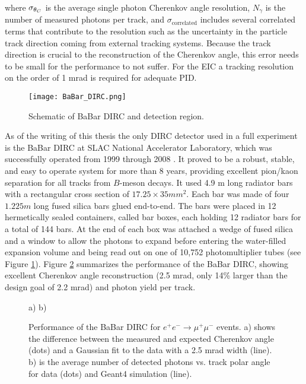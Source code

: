 where $\sigma_{\theta_{C}}$ is the average single photon Cherenkov angle resolution, $N_{\gamma}$ is the number of measured photons per track, and $\sigma_{\text{correlated}}$ includes several correlated terms that contribute to the resolution such as the uncertainty in the particle track direction coming from external tracking systems. Because the track direction is crucial to the reconstruction of the Cherenkov angle, this error needs to be small for the performance to not suffer. For the EIC a tracking resolution on the order of 1 mrad is required for adequate PID.

\begin{figure}[ht]
	\centering
	\texttt{[image: BaBar\_DIRC.png]}
	\caption{Schematic of BaBar DIRC and detection region.}
	\label{fig:babardirc}
\end{figure}

As of the writing of this thesis the only DIRC detector used in a full experiment is the BaBar DIRC at SLAC National Accelerator Laboratory, which was successfully operated from 1999 through 2008 \cite{BaBarDIRC}. It proved to be a robust, stable, and easy to operate system for more than 8 years, providing excellent pion/kaon separation for all tracks from $B$-meson decays. It used 4.9 m long radiator bars with a rectangular cross section of $17.25 \times 35 \unit{mm}^2$. Each bar was made of four $1.225\unit{m}$ long fused silica bars glued end-to-end. The bars were placed in 12 hermetically sealed containers, called bar boxes, each holding 12 radiator bars for a total of 144 bars. At the end of each box was attached a wedge of fused silica and a window to allow the photons to expand before entering the water-filled expansion volume and being read out on one of 10,752 photomultiplier tubes (see Figure \ref{fig:babardirc}). Figure \ref{fig:babarperformance} summarizes the performance of the BaBar DIRC, showing excellent Cherenkov angle reconstruction (2.5 mrad, only 14\% larger than the design goal of 2.2 mrad) and photon yield per track.

\begin{figure}[ht]
	\centering
	a)%
	b)%
	\caption{Performance of the BaBar DIRC for $e^{+}e^{-} \rightarrow \mu^{+}\mu^{-}$ events. a) shows the difference between the measured and expected Cherenkov angle (dots) and a Gaussian fit to the data with a 2.5 mrad width (line). b) is the average number of detected photons vs. track polar angle for data (dots) and Geant4 \cite{Geant4} simulation (line).}
	\label{fig:babarperformance}
\end{figure}

